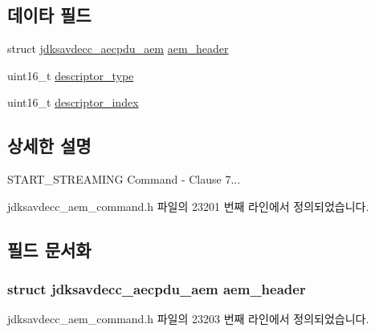 \subsection*{데이타 필드}
\begin{DoxyCompactItemize}
\item 
struct \hyperlink{structjdksavdecc__aecpdu__aem}{jdksavdecc\+\_\+aecpdu\+\_\+aem} \hyperlink{structjdksavdecc__aem__command__start__streaming_ae1e77ccb75ff5021ad923221eab38294}{aem\+\_\+header}
\item 
uint16\+\_\+t \hyperlink{structjdksavdecc__aem__command__start__streaming_ab7c32b6c7131c13d4ea3b7ee2f09b78d}{descriptor\+\_\+type}
\item 
uint16\+\_\+t \hyperlink{structjdksavdecc__aem__command__start__streaming_a042bbc76d835b82d27c1932431ee38d4}{descriptor\+\_\+index}
\end{DoxyCompactItemize}


\subsection{상세한 설명}
S\+T\+A\+R\+T\+\_\+\+S\+T\+R\+E\+A\+M\+I\+NG Command -\/ Clause 7... 

jdksavdecc\+\_\+aem\+\_\+command.\+h 파일의 23201 번째 라인에서 정의되었습니다.



\subsection{필드 문서화}
\subsubsection[{\texorpdfstring{aem\+\_\+header}{aem_header}}]{\setlength{\rightskip}{0pt plus 5cm}struct {\bf jdksavdecc\+\_\+aecpdu\+\_\+aem} aem\+\_\+header}\hypertarget{structjdksavdecc__aem__command__start__streaming_ae1e77ccb75ff5021ad923221eab38294}{}\label{structjdksavdecc__aem__command__start__streaming_ae1e77ccb75ff5021ad923221eab38294}


jdksavdecc\+\_\+aem\+\_\+command.\+h 파일의 23203 번째 라인에서 정의되었습니다.

